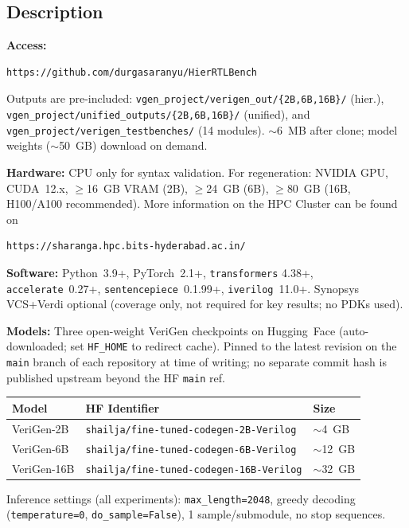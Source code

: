 \documentclass[sigplan,10pt,twocolumn]{acmart}
\begin{document}
\begin{itemize}
\subsection{Description}

\noindent\textbf{Access:}
\begin{lstlisting}
https://github.com/durgasaranyu/HierRTLBench
\end{lstlisting}
Outputs are pre-included: \texttt{vgen\_project/verigen\_out/\{2B,6B,16B\}/}
(hier.), \texttt{vgen\_project/unified\_outputs/\{2B,6B,16B\}/} (unified),
and \texttt{vgen\_project/verigen\_testbenches/} (14 modules). $\sim$6~MB
after clone; model weights ($\sim$50~GB) download on demand.

\noindent\textbf{Hardware:} CPU only for syntax validation. For
regeneration: NVIDIA GPU, CUDA~12.x, $\geq$16~GB VRAM (2B), $\geq$24~GB
(6B), $\geq$80~GB (16B, H100/A100 recommended).
More information on the HPC Cluster can be found on  
\begin{lstlisting}
https://sharanga.hpc.bits-hyderabad.ac.in/
\end{lstlisting}

\noindent\textbf{Software:} Python~3.9+, PyTorch~2.1+, \texttt{transformers}
4.38+, \texttt{accelerate}~0.27+, \texttt{sentencepiece}~0.1.99+,
\texttt{iverilog}~11.0+. Synopsys VCS+Verdi optional (coverage only, not
required for key results; no PDKs used).

\noindent\textbf{Models:} Three open-weight VeriGen checkpoints on
Hugging~Face (auto-downloaded; set \texttt{HF\_HOME} to redirect cache).
Pinned to the latest revision on the \texttt{main} branch of each
repository at time of writing; no separate commit hash is published
upstream beyond the HF \texttt{main} ref.

\begin{table}[h]
\centering\footnotesize
\begin{tabular}{@{}lll@{}}
\toprule
Model & HF Identifier & Size \\
\midrule
VeriGen-2B  & \texttt{shailja/fine-tuned-codegen-2B-Verilog}  & $\sim$4~GB \\
VeriGen-6B  & \texttt{shailja/fine-tuned-codegen-6B-Verilog}  & $\sim$12~GB \\
VeriGen-16B & \texttt{shailja/fine-tuned-codegen-16B-Verilog} & $\sim$32~GB \\
\bottomrule
\end{tabular}
\end{table}
\vspace{-6pt}
Inference settings (all experiments): \texttt{max\_length=2048}, greedy
decoding (\texttt{temperature=0}, \texttt{do\_sample=False}),
1 sample/submodule, no stop sequences.


\end{itemize}
\end{document}
